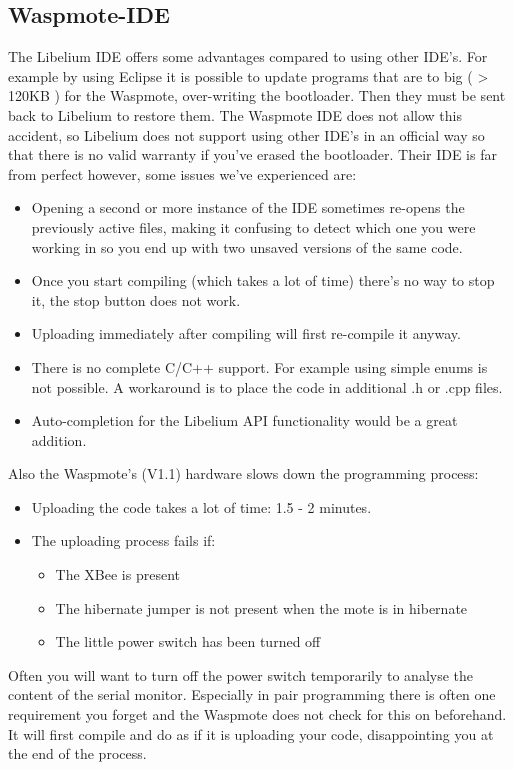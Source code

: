 \subsection{Waspmote-IDE}
The Libelium IDE offers some advantages compared to using other IDE's. For example by using Eclipse it is possible to update programs that are to big ( > 120KB ) for the Waspmote, over-writing the bootloader. Then they must be sent back to Libelium to restore them. The Waspmote IDE does not allow this accident, so Libelium does not support using other IDE's in an official way so that there is no valid warranty if you've erased the bootloader. Their IDE is far from perfect however, some issues we've experienced are:\\
\begin{itemize}
\item Opening a second or more instance of the IDE sometimes re-opens the previously active files, making it confusing to detect which one you were working in so you end up with two unsaved versions of the same code.
\item Once you start compiling (which takes a lot of time) there's no way to stop it, the stop button does not work.
\item Uploading immediately after compiling will first re-compile it anyway.
\item There is no complete C/C++ support. For example using simple enums is not possible. A workaround is to place the code in additional .h or .cpp files.
\item Auto-completion for the Libelium API functionality would be a great addition.
\end{itemize}
\bigskip
Also the Waspmote's (V1.1) hardware slows down the programming process:
\begin{itemize}
\item Uploading the code takes a lot of time: 1.5 - 2 minutes.
\item The uploading process fails if:
\begin{itemize}
\item The XBee is present
\item The hibernate jumper is not present when the mote is in hibernate
\item The little power switch has been turned off
\end{itemize}
\end{itemize}
Often you will want to turn off the power switch temporarily to analyse the content of the serial monitor. Especially in pair programming there is often one requirement you forget and the Waspmote does not check for this on beforehand. It will first compile and do as if it is uploading your code, disappointing you at the end of the process.\\
